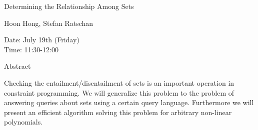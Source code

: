 \begin{center}
\LARGE
Determining the Relationship Among Sets

\end{center}

\begin{center}
\Large
Hoon Hong, Stefan Ratschan

\end{center}

\noindent
Date:  July 19th (Friday)\\
Time:  11:30-12:00\\

\begin{center}
\large
Abstract
\end{center}

Checking the entailment/disentailment of sets is an important operation in constraint
programming. We will generalize this problem to the problem of answering queries about sets
using a certain query language. Furthermore we will present an efficient algorithm solving this
problem for arbitrary non-linear polynomials. 

